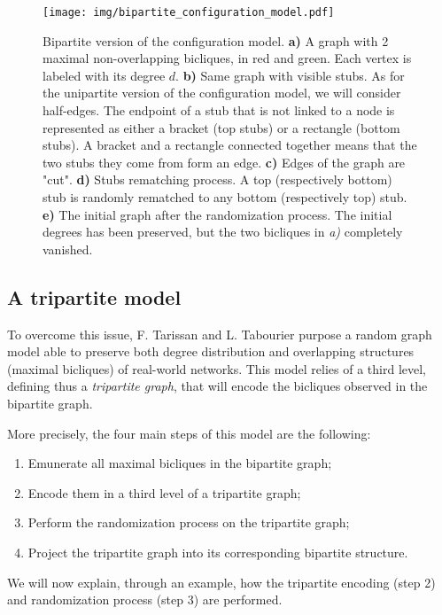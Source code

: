 \documentclass[table]{report}
\begin{document}
\begin{figure}[h]%
\centering
\texttt{[image: img/bipartite\_configuration\_model.pdf]}
\caption{Bipartite version of the configuration model. \textbf{a)} A graph with 2 maximal non-overlapping bicliques, in red and green. Each vertex is labeled with its degree $d$.
\textbf{b)} Same graph with visible stubs. As for the unipartite version of the configuration model, we will consider half-edges. The endpoint of a stub that is not linked to a node is represented as either a bracket (top stubs) or a rectangle (bottom stubs). A bracket and a rectangle connected together means that the two stubs they come from form an edge. 
\textbf{c)} Edges of the graph are "cut". 
\textbf{d)} Stubs rematching process. A top (respectively bottom) stub  is randomly rematched to any bottom (respectively top) stub. 
\textbf{e)} The initial graph after the randomization process. The initial degrees has been preserved, but the two bicliques in \textit{a)} completely vanished. 
}
\label{fig:bipartite_configuration_model}
\end{figure}
\FloatBarrier

\subsection{A tripartite model}


To overcome this issue, F. Tarissan and L. Tabourier purpose a random graph model able to preserve both degree distribution and overlapping structures (maximal bicliques) of real-world networks. This model relies of a third level, defining thus a \textit{tripartite graph}, that will encode the bicliques observed in the bipartite graph. 

\medbreak
\noindent
More precisely, the four main steps of this model are the following:
\begin{enumerate}[noitemsep]
    \item Emunerate all maximal bicliques in the bipartite graph;
    \item Encode them in a third level of a tripartite graph;
    \item Perform the randomization process on the tripartite graph;
    \item Project the tripartite graph into its corresponding bipartite structure.
\end{enumerate}


We will now explain, through an example, how the tripartite encoding (step 2) and randomization process (step 3) are performed. 
\end{document}
